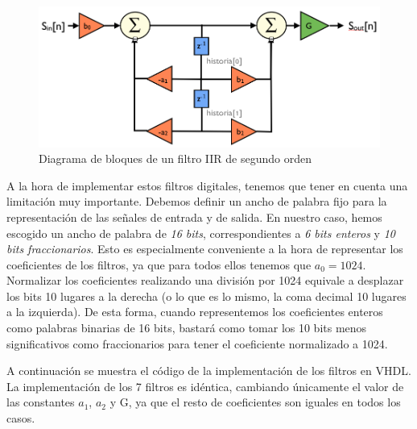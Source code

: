 \documentclass[a4paper,12pt]{article}
\begin{document}
\begin{figure}[hbt]
\includegraphics[width=\textwidth]{img/filter.png} 
\caption{Diagrama de bloques de un filtro IIR de segundo orden} \label{fig:filter_diagram}
\end{figure}

A la hora de implementar estos filtros digitales, tenemos que tener en cuenta una limitación muy importante. Debemos definir un ancho de palabra fijo para la representación de las señales de entrada y de salida. En nuestro caso, hemos escogido un ancho de palabra de \emph{16 bits}, correspondientes a \emph{6 bits enteros} y \emph{10 bits fraccionarios}. Esto es especialmente conveniente a la hora de representar los coeficientes de los filtros, ya que para todos ellos tenemos que $a_0 = 1024$. Normalizar los coeficientes realizando una división por 1024 equivale a desplazar los bits 10 lugares a la derecha (o lo que es lo mismo, la coma decimal 10 lugares a la izquierda). De esta forma, cuando representemos los coeficientes enteros como palabras binarias de 16 bits, bastará como tomar los 10 bits menos significativos como fraccionarios para tener el coeficiente normalizado a 1024.

A continuación se muestra el código de la implementación de los filtros en VHDL. La implementación de los 7 filtros es idéntica, cambiando únicamente el valor de las constantes $a_1$, $a_2$ y G, ya que el resto de coeficientes son iguales en todos los casos.
\end{document}
